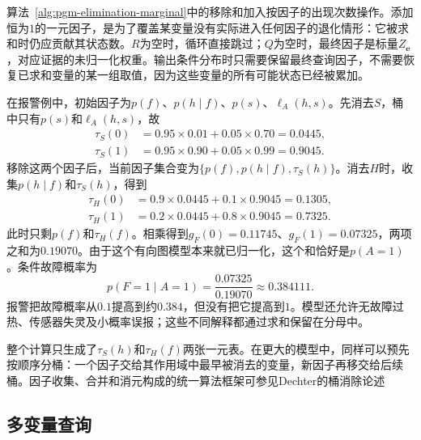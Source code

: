 算法~\ref{alg:pgm-elimination-marginal}中的移除和加入按因子的出现次数操作。添加恒为$1$的一元因子，是为了覆盖某变量没有实际进入任何因子的退化情形：它被求和时仍应贡献其状态数。$R$为空时，循环直接跳过；$Q$为空时，最终因子是标量$Z_{\bm{e}}$，对应证据的未归一化权重。输出条件分布时只需要保留最终查询因子，不需要恢复已求和变量的某一组取值，因为这些变量的所有可能状态已经被累加。

在报警例中，初始因子为$p(f)$、$p(h\mid f)$、$p(s)$、$\ell_A(h,s)$。先消去$S$，桶中只有$p(s)$和$\ell_A(h,s)$，故
\begin{equation}
  \begin{aligned}
    \tau_S(0)&=0.95\times0.01+0.05\times0.70=0.0445,\\
    \tau_S(1)&=0.95\times0.90+0.05\times0.99=0.9045.
  \end{aligned}
  \label{eq:pgm-elimination-alarm-s}
\end{equation}
移除这两个因子后，当前因子集合变为$\{p(f),p(h\mid f),\tau_S(h)\}$。消去$H$时，收集$p(h\mid f)$和$\tau_S(h)$，得到
\begin{equation}
  \begin{aligned}
    \tau_H(0)&=0.9\times0.0445+0.1\times0.9045=0.1305,\\
    \tau_H(1)&=0.2\times0.0445+0.8\times0.9045=0.7325.
  \end{aligned}
  \label{eq:pgm-elimination-alarm-h}
\end{equation}
此时只剩$p(f)$和$\tau_H(f)$。相乘得到$g_F(0)=0.11745$、$g_F(1)=0.07325$，两项之和为$0.19070$。由于这个有向图模型本来就已归一化，这个和恰好是$p(A=1)$。条件故障概率为
\begin{equation}
  p(F=1\mid A=1)
  =\frac{0.07325}{0.19070}
  \approx0.384111.
  \label{eq:pgm-elimination-alarm-posterior}
\end{equation}
报警把故障概率从$0.1$提高到约$0.384$，但没有把它提高到$1$。模型还允许无故障过热、传感器失灵及小概率误报；这些不同解释都通过求和保留在分母中。

整个计算只生成了$\tau_S(h)$和$\tau_H(f)$两张一元表。在更大的模型中，同样可以预先按顺序分桶：一个因子交给其作用域中最早被消去的变量，新因子再移交给后续桶。因子收集、合并和消元构成的统一算法框架可参见Dechter的桶消除论述

\subsection{多变量查询}
\label{sec:pgm-elimination-multivariate-query}


